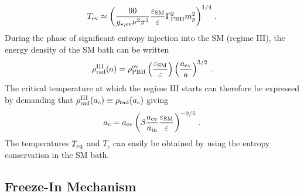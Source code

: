 \documentclass[aps,prd,reprint,twocolumn,preprintnumbers,floatfix,nofootinbib]{revtex4-1}
\newcommand{\be}{\begin{equation}}
\newcommand{\ee}{\end{equation}}
\begin{document}
\be\label{eq:ev}
T_{\rm ev}\approx\left(\frac{90}{g_{\star,{\rm ev}}\nu^2\pi^2}\frac{\varepsilon_{\rm SM}}{\varepsilon}\Gamma_{\rm PBH}^2 m_p^2\right)^{1/4}\,.
\ee
During the phase of significant entropy injection into the SM (regime III), the energy density of the SM bath can be written
\be
\rho_{\rm rad}^{\rm III}(a)=\rho_{\rm PBH}^{\rm ev}\left(\frac{\varepsilon_{\rm SM}}{\varepsilon}\right)\left(\frac{a_{\rm ev}}{a}\right)^{3/2}\,.
\ee
The critical temperature at which the regime III starts can therefore be expressed by demanding that $\rho_{\rm rad}^{\rm III}(a_c)\equiv \rho_{\rm rad}(a_c)$ giving
\be
a_c=a_{\rm ev}\left(\beta\frac{a_{\rm ev}}{a_{\rm in}}\frac{\varepsilon_{\rm SM}}{\varepsilon}\right)^{-2/5}\,.
\ee
The temperatures $T_{\rm eq}$ and $T_c$ can easily be obtained by using the entropy conservation in the SM bath. 

\subsection{Freeze-In Mechanism}
\end{document}
